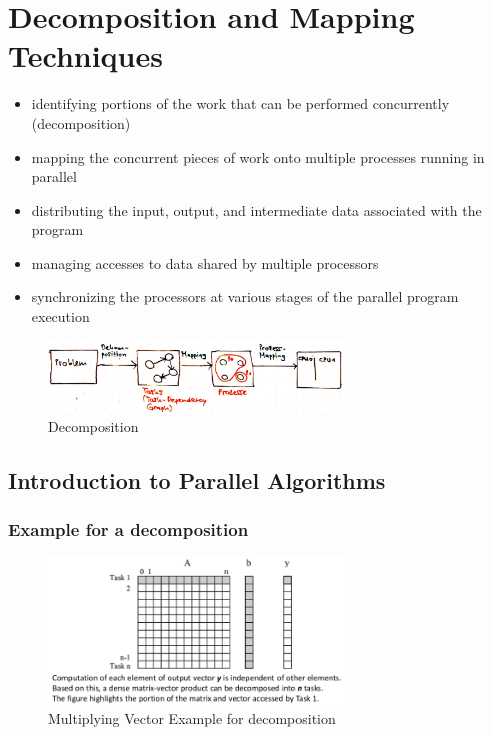 \hypertarget{decomposition-and-mapping-techniques}{%
\section{Decomposition and Mapping
Techniques}\label{decomposition-and-mapping-techniques}}

\begin{itemize}
\tightlist
\item
  identifying portions of the work that can be performed concurrently
  (decomposition)
\item
  mapping the concurrent pieces of work onto multiple processes running
  in parallel
\item
  distributing the input, output, and intermediate data associated with
  the program
\item
  managing accesses to data shared by multiple processors
\item
  synchronizing the processors at various stages of the parallel program
  execution
\end{itemize}

\begin{figure}[H]
\centering
\includegraphics[width=0.7\textwidth]{figures/decomposition.png}
\caption{Decomposition}
\end{figure}

\hypertarget{introduction-to-parallel-algorithms}{%
\subsection{Introduction to Parallel
Algorithms}\label{introduction-to-parallel-algorithms}}

\hypertarget{example-for-a-decomposition}{%
\subsubsection{Example for a
decomposition}\label{example-for-a-decomposition}}

\begin{figure}[H]
\centering
\includegraphics[width=0.7\textwidth]{figures/ExampleVectorMultiplication.png}
\caption{Multiplying Vector Example for decomposition}
\end{figure}

